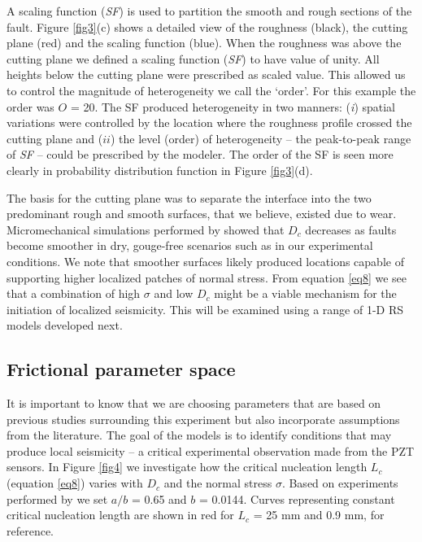 \documentclass[draft]{agujournal2019}
\begin{document}
A scaling function (\textit{SF}) is used to partition the smooth and rough sections of the fault. Figure \ref{fig3}(c) shows a detailed view of the roughness (black), the cutting plane (red) and the scaling function (blue). When the roughness was above the cutting plane we defined a scaling function (\textit{SF}) to have value of unity. All heights below the cutting plane were prescribed as scaled value. This allowed us to control the magnitude of heterogeneity we call the `order'. For this example the order was $O$ = 20. The SF produced heterogeneity in two manners: (\textit{i}) spatial variations were controlled by the location where the roughness profile crossed the cutting plane and ($ii$) the level (order) of heterogeneity -- the peak-to-peak range of \textit{SF} -- could be prescribed by the modeler. The order of the SF is seen more clearly in probability distribution function in Figure \ref{fig3}(d).

	The basis for the cutting plane was to separate the interface into the two predominant rough and smooth surfaces, that we believe, existed due to wear.  Micromechanical simulations performed by  showed that $D_{c}$ decreases as faults become smoother in dry, gouge-free scenarios such as in our experimental conditions. We  note that smoother surfaces likely produced locations capable of supporting higher localized patches of normal stress. From equation \eqref{eq8} we see that a combination of high $\sigma$ and low $D_{c}$ might be a viable mechanism for the initiation of localized seismicity. This will be examined using a range of 1-D RS models developed next.

\subsection{Frictional parameter space}
\label{ParameterSpace}

It is important to know that we are choosing parameters that are based on previous studies surrounding this experiment but also incorporate assumptions from the literature. The goal of the models is to identify conditions that may produce local seismicity -- a critical experimental observation made from the PZT sensors. In Figure \ref{fig4} we investigate how the critical nucleation length $L_{c}$ (equation \eqref{eq8}) varies with $D_{c}$ and the normal stress $\sigma$.  Based on experiments performed by  we set $a/b$ = 0.65 and $b$ = 0.0144. Curves representing constant critical nucleation length are shown in red for $L_{c}$ = 25 mm and 0.9 mm, for reference.   
\end{document}
